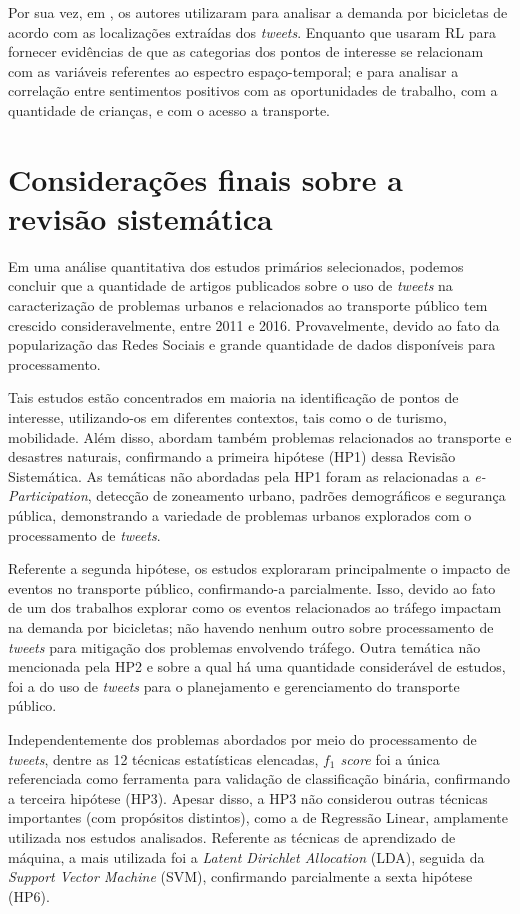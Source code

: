 \documentclass[
	12pt,				%
	oneside,			%
	a4paper,			%
	english,			%
	brazil				%
	]{abntex2ppgsi}
\begin{document}
{{{Por sua vez, em \cite{Gutev2016}, os autores utilizaram  para analisar a demanda por bicicletas de acordo com as localizações extraídas dos \textit{tweets}. Enquanto que \cite{Bendler2014} usaram RL para fornecer evidências de que as categorias dos pontos de interesse se relacionam com as variáveis referentes ao espectro espaço-temporal; e \cite{Guo2016} para analisar a correlação entre sentimentos positivos com as oportunidades de trabalho, com a quantidade de crianças, e com o acesso a transporte. 

\section{Considerações finais sobre a revisão sistemática}
\label{conclusao}
Em uma análise quantitativa dos estudos primários selecionados, podemos concluir que a quantidade de artigos publicados sobre o uso de \textit{tweets} na caracterização de problemas urbanos e relacionados ao transporte público tem crescido consideravelmente, entre 2011 e 2016. Provavelmente, devido ao fato da popularização das Redes Sociais e grande quantidade de dados disponíveis para processamento.

Tais estudos estão concentrados em maioria na identificação de pontos de interesse, utilizando-os em diferentes contextos, tais como o de turismo, mobilidade. Além disso, abordam também problemas relacionados ao transporte e desastres naturais, confirmando a primeira hipótese (HP1) dessa Revisão Sistemática. As temáticas não abordadas pela HP1 foram as relacionadas a \textit{e-Participation}, detecção de zoneamento urbano, padrões demográficos e segurança pública, demonstrando a variedade de problemas urbanos explorados com o processamento de \textit{tweets}.

Referente a segunda hipótese, os estudos exploraram principalmente o impacto de eventos no transporte público, confirmando-a parcialmente. Isso, devido ao fato de um dos trabalhos explorar como os eventos relacionados ao tráfego impactam na demanda por bicicletas; não havendo nenhum outro sobre processamento de \textit{tweets} para mitigação dos problemas envolvendo tráfego. Outra temática não mencionada pela HP2 e sobre a qual há uma quantidade considerável de estudos, foi a do uso de \textit{tweets} para o planejamento e gerenciamento do transporte público.

Independentemente dos problemas abordados por meio do processamento de \textit{tweets}, dentre as 12 técnicas estatísticas elencadas, \textit{${f_1}$ score} foi a única referenciada como ferramenta para validação de classificação binária, confirmando a terceira hipótese (HP3). Apesar disso, a HP3 não considerou outras técnicas importantes (com propósitos distintos), como a de Regressão Linear, amplamente utilizada nos estudos analisados. Referente as técnicas de aprendizado de máquina, a mais utilizada foi a \textit{Latent Dirichlet Allocation} (LDA), seguida da \textit{Support Vector Machine} (SVM), confirmando parcialmente a sexta hipótese (HP6).

}}}
\end{document}

